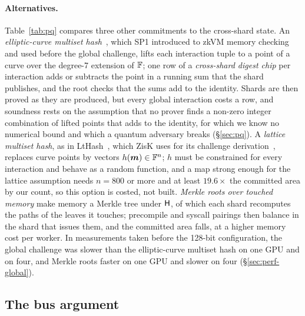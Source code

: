 \paragraph{Alternatives.} Table~\ref{tab:pq} compares three other commitments to the cross-shard state. An \emph{elliptic-curve multiset hash}~\citep{multiset-hash,bellare-micciancio,ec-multiset-hash}, which SP1 introduced to zkVM memory checking~\citep{sp1-turbo-memo} and \Ziren{} used before the global challenge, lifts each interaction tuple to a point of a curve over the degree-7 extension of $\mathbb{F}$; one row of a \emph{cross-shard digest chip} per interaction adds or subtracts the point in a running sum that the shard publishes, and the root checks that the sums add to the identity. Shards are then proved as they are produced, but every global interaction costs a row, and soundness rests on the assumption that no prover finds a non-zero integer combination of lifted points that adds to the identity, for which we know no numerical bound and which a quantum adversary breaks (\S\ref{sec:pq}). A \emph{lattice multiset hash}, as in LtHash~\citep{lthash}, which ZisK uses for its challenge derivation~\citep{zisk-lthash}, replaces curve points by vectors $h(\bm m) \in \mathbb{F}^n$; $h$ must be constrained for every interaction and behave as a random function, and a map strong enough for the lattice assumption needs $n = 800$ or more and at least $19.6\times$ the committed area by our count, so this option is costed, not built. \emph{Merkle roots over touched memory} make memory a Merkle tree under $\mathsf{H}$, of which each shard recomputes the paths of the leaves it touches; precompile and syscall pairings then balance in the shard that issues them, and the committed area falls, at a higher memory cost per worker. In measurements taken before the 128-bit configuration, the global challenge was slower than the elliptic-curve multiset hash on one GPU and on four, and Merkle roots faster on one GPU and slower on four (\S\ref{sec:perf-global}).

\subsection{The bus argument}
\label{sec:air-logup}

